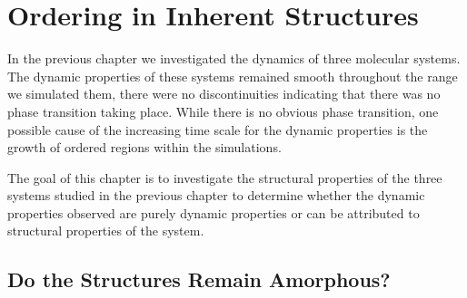 \chapter{Ordering in Inherent Structures}

In the previous chapter we investigated the dynamics of three molecular systems. The dynamic properties of these systems remained smooth throughout the range we simulated them, there were no discontinuities indicating that there was no phase transition taking place. While there is no obvious phase transition, one possible cause of the increasing time scale for the dynamic properties is the growth of ordered regions within the simulations.

The goal of this chapter is to investigate the structural properties of the three systems studied in the previous chapter to determine whether the dynamic properties observed are purely dynamic properties or can be attributed to structural properties of the system.

\section{Do the Structures Remain Amorphous?}

